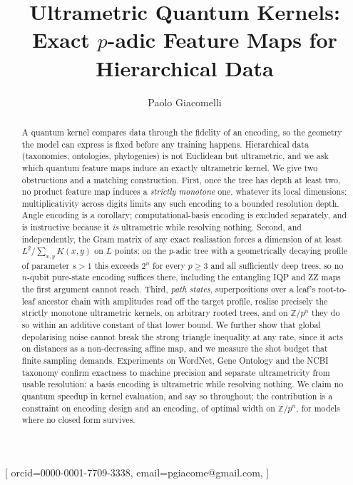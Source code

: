 \documentclass{ceurart}
\newcommand{\Zpn}{\mathbb{Z}/p^{n}}
\theoremstyle{plain}
\theoremstyle{definition}
\theoremstyle{remark}
\begin{document}


\title{Ultrametric Quantum Kernels: Exact $p$-adic Feature Maps for Hierarchical Data}

\author[1]{Paolo Giacomelli}[
  orcid=0000-0001-7709-3338,
  email=pgiacome@gmail.com,
]
\address[1]{Tenax S.p.A.}

\begin{abstract}
  A quantum kernel compares data through the fidelity of an encoding, so the geometry
  the model can express is fixed before any training happens. Hierarchical data
  (taxonomies, ontologies, phylogenies) is not Euclidean but ultrametric, and we ask
  which quantum feature maps induce an exactly ultrametric kernel. We give two
  obstructions and a matching construction. First, once the tree has depth at least
  two, no product feature map induces a \emph{strictly monotone} one, whatever its
  local dimensions: multiplicativity across digits limits any such encoding to a
  bounded resolution depth. Angle encoding is a corollary; computational-basis
  encoding is excluded separately, and is instructive because it \emph{is}
  ultrametric while resolving nothing.
  Second, and independently, the Gram matrix of any exact realisation forces a
  dimension of at least $L^{2} / \sum_{x,y} K(x,y)$ on $L$ points; on the $p$-adic tree
  with a geometrically decaying profile of parameter $s > 1$ this exceeds $2^{n}$ for
  every $p \ge 3$ and all sufficiently deep trees, so no $n$-qubit pure-state encoding
  suffices there, including the entangling IQP and ZZ maps the first argument cannot
  reach. Third, \emph{path states}, superpositions over a leaf's
  root-to-leaf ancestor chain with amplitudes read off the target profile, realise
  precisely the strictly monotone ultrametric kernels, on arbitrary rooted trees, and on
  $\Zpn$ they do so within an additive constant of that lower bound. We further show
  that global depolarising noise cannot break the strong triangle inequality at any
  rate, since it acts on distances as a non-decreasing affine map, and we measure the shot budget that finite
  sampling demands. Experiments on WordNet, Gene Ontology and the NCBI taxonomy confirm
  exactness to machine precision and separate ultrametricity from usable resolution: a
  basis encoding is ultrametric while resolving nothing. We claim no quantum speedup in
  kernel evaluation, and say so throughout; the contribution is a constraint on
  encoding design and an encoding, of optimal width on $\Zpn$, for models where no
  closed form survives.
\end{abstract}
\end{document}
